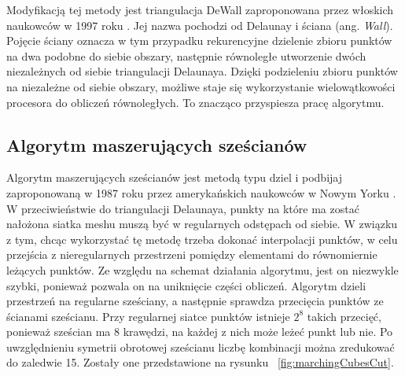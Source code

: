 Modyfikacją tej metody jest triangulacja DeWall zaproponowana przez włoskich naukowców w 1997 roku \cite{cignoni1998dewall}. Jej nazwa pochodzi od Delaunay i ściana (ang. \textit{Wall}). Pojęcie ściany oznacza w tym przypadku rekurencyjne dzielenie zbioru punktów na dwa podobne do siebie obszary, następnie równoległe utworzenie dwóch niezależnych od siebie triangulacji Delaunaya. Dzięki podzieleniu zbioru punktów na niezależne od siebie obszary, możliwe staje się wykorzystanie wielowątkowości procesora do obliczeń równoległych. To znacząco przyspiesza pracę algorytmu.
\subsection{Algorytm maszerujących sześcianów}
Algorytm maszerujących sześcianów jest metodą typu dziel i podbijaj zaproponowaną w 1987 roku przez amerykańskich naukowców w Nowym Yorku \cite{lorensen1987marching}. W przeciwieństwie do triangulacji Delaunaya, punkty na które ma zostać nałożona siatka meshu muszą być w regularnych odstępach od siebie. W związku z tym, chcąc wykorzystać tę metodę trzeba dokonać interpolacji punktów, w celu przejścia z nieregularnych przestrzeni pomiędzy elementami do równomiernie leżących punktów. Ze względu na schemat działania algorytmu, jest on niezwykle szybki, ponieważ pozwala on na uniknięcie części obliczeń. Algorytm dzieli przestrzeń na regularne sześciany, a następnie sprawdza przecięcia punktów ze ścianami sześcianu. Przy regularnej siatce punktów istnieje $2^8$ takich przecięć, ponieważ sześcian ma 8 krawędzi, na każdej z nich może leżeć punkt lub nie. Po uwzględnieniu symetrii obrotowej sześcianu liczbę kombinacji można zredukować do zaledwie 15. Zostały one przedstawione na rysunku ~\ref{fig:marchingCubesCut}.
